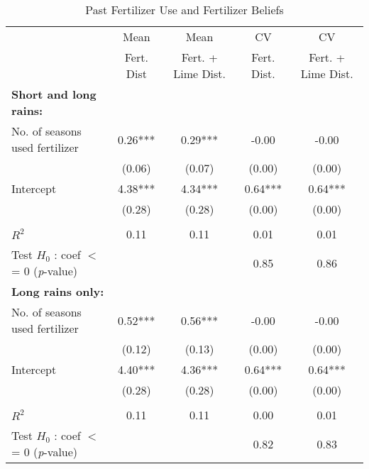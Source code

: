\begin{table}[htbp]
\centering
\hspace*{-1.2cm}
\begin{threeparttable}
\caption{Past Fertilizer Use and Fertilizer Beliefs}
\label{tab:A1dist}
\begin{tabular}{l cccc}
\hline
\hline
& Mean & Mean & CV & CV \\
& Fert. Dist & Fert. + Lime Dist. & Fert. Dist. & Fert. + Lime Dist. \\ \hline
\textbf{Short and long rains:}&               &               &               &               \\
No. of seasons used fertilizer&        0.26***&        0.29***&       -0.00   &       -0.00   \\
                    &      (0.06)   &      (0.07)   &      (0.00)   &      (0.00)   \\
Intercept           &        4.38***&        4.34***&        0.64***&        0.64***\\
                    &      (0.28)   &      (0.28)   &      (0.00)   &      (0.00)   \\
                    &               &               &               &               \\
$R^2$               &        0.11   &        0.11   &        0.01   &        0.01   \\
Test $ H_0 $ :  coef $<$= 0 (\textit{p}-value)&               &               &        0.85   &        0.86   \\
\hline
%
\textbf{Long rains only:}&               &               &               &               \\
No. of seasons used fertilizer&        0.52***&        0.56***&       -0.00   &       -0.00   \\
                    &      (0.12)   &      (0.13)   &      (0.00)   &      (0.00)   \\
Intercept           &        4.40***&        4.36***&        0.64***&        0.64***\\
                    &      (0.28)   &      (0.28)   &      (0.00)   &      (0.00)   \\
                    &               &               &               &               \\
$R^2$               &        0.11   &        0.11   &        0.00   &        0.01   \\
Test $H_0$ :  coef $<$= 0 (\textit{p}-value)&               &               &        0.82   &        0.83   \\

\end{tabular}
\end{threeparttable}
\end{table}
